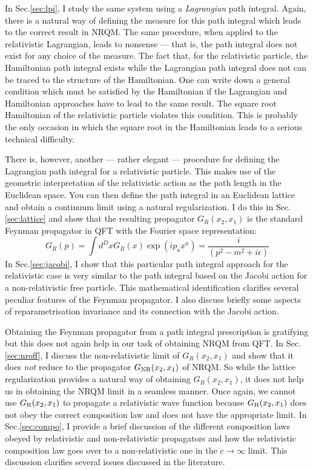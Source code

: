 \documentclass[12pt]{article}
\begin{document}
 In Sec.\ref{sec:lpi}, I study the same system using a \textit{Lagrangian} path integral. Again, there is a natural way of defining the measure for this path integral which leads to the correct result in NRQM. The same procedure, when applied to the relativistic Lagrangian, leads to nonsense --- that is, the path integral does not exist for any choice of the measure. The fact that, for the relativistic particle,  the Hamiltonian path integral exists while the Lagrangian path integral does not can be traced to the structure of the Hamiltonian. One can write down a general condition which must be satisfied by the Hamiltonian if the Lagrangian and Hamiltonian approaches have to lead to the same result. The square root Hamiltonian of the relativistic particle violates this condition. This is probably the only occasion in which the square root in the Hamiltonian leads to a serious technical difficulty. 
 
 There is, however, another --- rather elegant --- procedure for defining the Lagrangian path integral for a relativistic particle. This makes use of the geometric interpretation of the relativistic action as the path length in the Euclidean space. You can then define the path integral in an Euclidean lattice and obtain a continuum limit using a natural regularization.  I do this in Sec.\ref{sec:lattice} and show that the resulting propagator $G_R(x_2,x_1)$ is the standard Feynman propagator in QFT with the Fourier space representation:
 \begin{equation}
G_R(p)=\int d^Dx G_R(x)\exp(i p_ax^a)=\frac{i}{(p^2-m^2+i\epsilon)}                                                                 
\end{equation} 
In Sec.\ref{sec:jacobi}, I show that this particular path integral approach for the relativistic case is very similar to the path integral based on the Jacobi action for  a non-relativistic free particle. This mathematical identification clarifies several peculiar features of the Feynman propagator.
 I also discuss briefly some aspects of reparametrisation invariance and its connection with the Jacobi action. 
 
 Obtaining the Feynman propagator from a path integral prescription is gratifying but this does not again help in our task of obtaining NRQM from QFT.
 In Sec.\ref{sec:nroff}, I discuss the non-relativistic limit of $G_R(x_2,x_1)$ and show that it does \textit{not} reduce to the propagator $G_{\rm NR}(x_2,x_1)$ of NRQM. So while the lattice regularization provides a natural way of obtaining $G_R(x_2,x_1)$, it does not help us in obtaining the NRQM limit in a seamless manner.
 Once again, we cannot use $G_{\rm R}(x_2,x_1)$ to propagate a relativistic wave function because $G_{\rm R}(x_2,x_1)$ does not obey the correct composition law and does not have the appropriate limit.
 In Sec.\ref{sec:compo}, I provide a brief discussion of the different composition laws obeyed by relativistic and non-relativistic propagators and how the relativistic composition law goes over to a non-relativistic one in the $c\to\infty$ limit. This discussion clarifies several issues discussed in the literature. 
 
\end{document}
